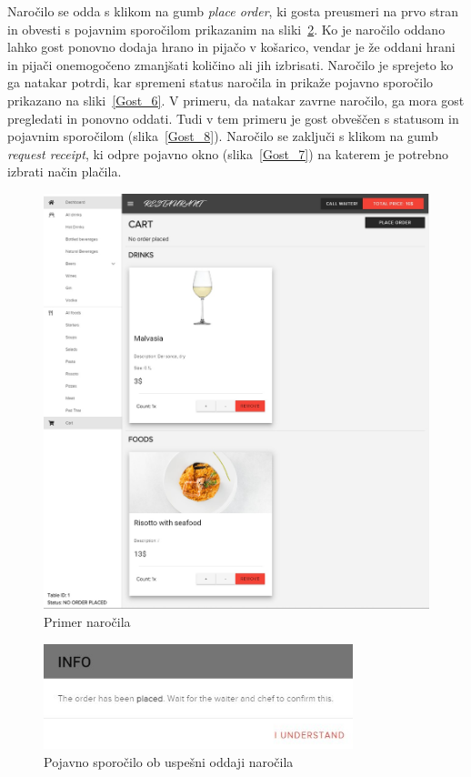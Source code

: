 \documentclass[a4paper, 12pt]{book}
\begin{document}
Naročilo se odda s klikom na gumb \textit{place order}, ki gosta preusmeri na prvo stran in obvesti s pojavnim sporočilom prikazanim na sliki~\ref{Gost_5}. Ko je naročilo oddano lahko gost ponovno dodaja hrano in pijačo v košarico, vendar je že oddani hrani in pijači onemogočeno zmanjšati količino ali jih izbrisati. Naročilo je sprejeto ko ga natakar potrdi, kar spremeni status naročila in prikaže pojavno sporočilo prikazano na sliki~\ref{Gost_6}. V primeru, da natakar zavrne naročilo, ga mora gost pregledati in ponovno oddati. Tudi v tem primeru je gost obveščen s statusom in pojavnim sporočilom (slika~\ref{Gost_8}). Naročilo se zaključi s klikom na gumb \textit{request receipt}, ki odpre pojavno okno (slika~\ref{Gost_7}) na katerem je potrebno izbrati način plačila.

\begin{figure}[!htb]
\begin{center}
\includegraphics[width=11.5cm]{gost_4.jpg}
\caption{Primer naročila}
\label{Gost_4}
\end{center}
\end{figure}

\begin{figure}[!htb]
\begin{center}
\includegraphics[width=9cm]{gost_5.jpg}
\caption{Pojavno sporočilo ob uspešni oddaji naročila}
\label{Gost_5}
\end{center}
\end{figure}
\end{document}

